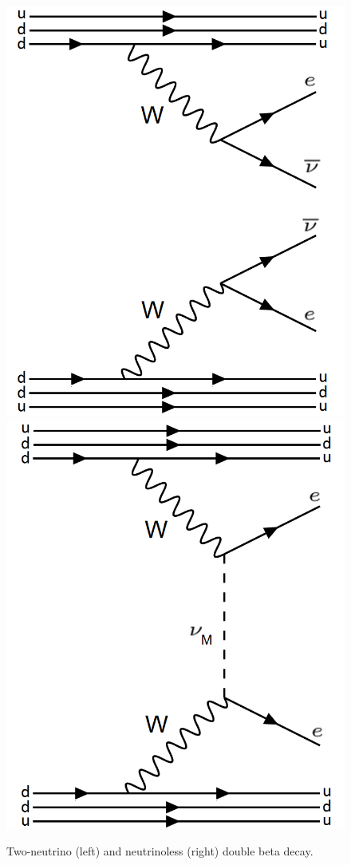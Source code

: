 \begin{figure}[H]
                \includegraphics[width=.35\textwidth]{figures/feynman_2nu_quarks.png}
                \includegraphics[width=.35\textwidth]{figures/feynman_0nu_quarks.png}
                \caption{Two-neutrino (left) and neutrinoless (right) double beta decay.}
        \label{fig:feynman_diags}
\end{figure}



